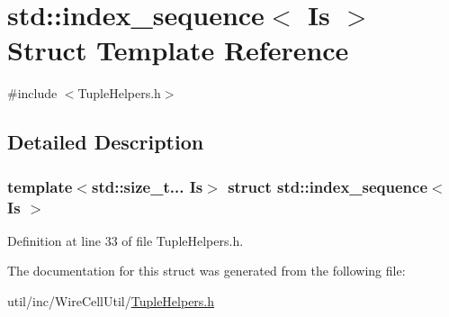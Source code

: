\hypertarget{structstd_1_1index__sequence}{}\section{std\+:\+:index\+\_\+sequence$<$ Is $>$ Struct Template Reference}
\label{structstd_1_1index__sequence}


{\ttfamily \#include $<$Tuple\+Helpers.\+h$>$}



\subsection{Detailed Description}
\subsubsection*{template$<$std\+::size\+\_\+t... Is$>$\newline
struct std\+::index\+\_\+sequence$<$ Is $>$}



Definition at line 33 of file Tuple\+Helpers.\+h.



The documentation for this struct was generated from the following file\+:\begin{DoxyCompactItemize}
\item 
util/inc/\+Wire\+Cell\+Util/\hyperlink{_tuple_helpers_8h}{Tuple\+Helpers.\+h}\end{DoxyCompactItemize}
